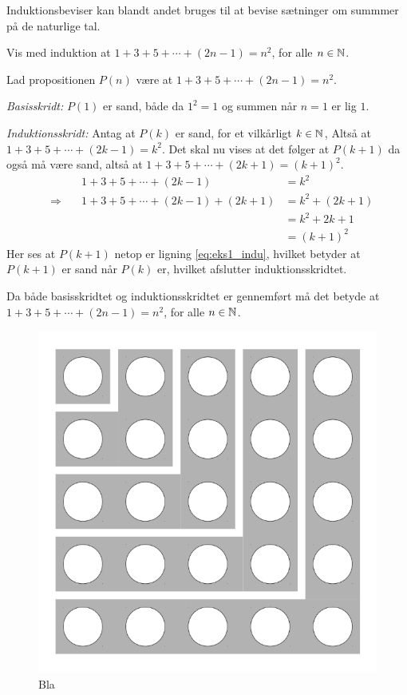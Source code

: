 Induktionsbeviser kan blandt andet bruges til at bevise sætninger om summmer på de naturlige tal.
\begin{exmp}
	Vis med induktion at $1 + 3 + 5 + \dotsb + (2n-1) = n^2$, for alle $n \in \mathbb{N}$.

	Lad propositionen $P(n)$ være at $1 + 3 + 5 + \dotsb + (2n-1) = n^2$.
	
	\textit{Basisskridt:} $P(1)$ er sand, både da $1^2 = 1$ og summen når $n = 1$ er lig $1$.

	\textit{Induktionsskridt:} Antag at $P(k)$ er sand, for et vilkårligt $k \in \mathbb{N}$, Altså at $1 + 3 + 5 + \dotsb + (2k-1) = k^2$.
	Det skal nu vises at det følger at $P(k + 1)$ da også må være sand, altså at $1 + 3 + 5 + \dotsb + (2k+1) = \left( k + 1 \right) ^2$.
	\begin{align}
		&&1 + 3 + 5 + \dotsb + (2k-1) 
		&= k^2 \nonumber \\
		&\Rightarrow \quad
		&1 + 3 + 5 + \dotsb + (2k-1) + (2k+1) 
		&= k^2 + (2k + 1) \nonumber \\
		&&&= k^2 + 2k + 1 \nonumber \\
		&&&= \left( k + 1 \right) ^2 \label{eq:eks1_indu}
	\end{align}
	Her ses at $P(k + 1)$ netop er ligning \eqref{eq:eks1_indu}, hvilket betyder at $P(k + 1)$ er sand når $P(k)$ er, hvilket afslutter induktionsskridtet.

	Da både basisskridtet og induktionsskridtet er gennemført må det betyde at $1 + 3 + 5 + \dotsb + (2n-1) = n^2$, for alle $n \in \mathbb{N}$.
\end{exmp}

\begin{figure}
	\begin{center}
		\includegraphics[scale=0.2]{fig/img/sum_of_n_first_odd_integers.png}
	\end{center}
	\caption{Bla} \label{fig1_indu}
\end{figure}

